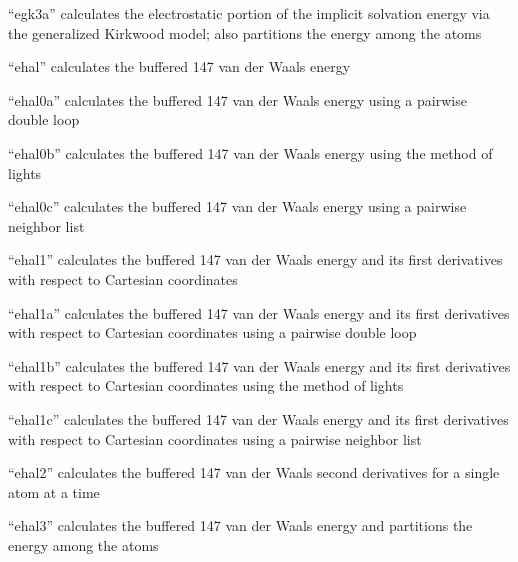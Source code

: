 \documentclass[letterpaper,11pt,english]{sphinxmanual}
\begin{document}

“egk3a” calculates the electrostatic portion of the implicit
solvation energy via the generalized Kirkwood model; also
partitions the energy among the atoms


“ehal” calculates the buffered 14\sphinxhyphen{}7 van der Waals energy


“ehal0a” calculates the buffered 14\sphinxhyphen{}7 van der Waals energy
using a pairwise double loop


“ehal0b” calculates the buffered 14\sphinxhyphen{}7 van der Waals energy
using the method of lights


“ehal0c” calculates the buffered 14\sphinxhyphen{}7 van der Waals energy
using a pairwise neighbor list


“ehal1” calculates the buffered 14\sphinxhyphen{}7 van der Waals energy and
its first derivatives with respect to Cartesian coordinates


“ehal1a” calculates the buffered 14\sphinxhyphen{}7 van der Waals energy and
its first derivatives with respect to Cartesian coordinates
using a pairwise double loop


“ehal1b” calculates the buffered 14\sphinxhyphen{}7 van der Waals energy and
its first derivatives with respect to Cartesian coordinates
using the method of lights


“ehal1c” calculates the buffered 14\sphinxhyphen{}7 van der Waals energy and
its first derivatives with respect to Cartesian coordinates
using a pairwise neighbor list


“ehal2” calculates the buffered 14\sphinxhyphen{}7 van der Waals second
derivatives for a single atom at a time


“ehal3” calculates the buffered 14\sphinxhyphen{}7 van der Waals energy
and partitions the energy among the atoms
\end{document}
